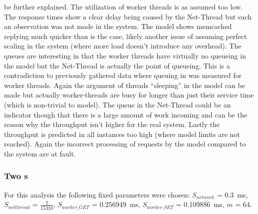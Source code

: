                 be further explained. The utilization of worker threads is as assumed too low. The response times show a
                clear delay being caused by the Net-Thread but such an observation was not made in the system. The
                model shows memcached replying much quicker than is the case, likely another issue of assuming perfect
                scaling in the system (where more load doesn't introduce any overhead). The queues are interesting in
                that the worker threads have virtually no queueing in the model but the Net-Thread is actually the point
                of queueing. This is a contradiction to previously gathered data where queuing in was measured for
                worker threads. Again the argument of threads ``sleeping'' in the model can be made but actually
                worker-threads are busy for longer than just their service time (which is non-trivial to model). The
                queue in the Net-Thread could be an indicator though that there is a large amount of work incoming and
                can be the reason why the throughput isn't higher for the real system. Lastly the throughput is
                predicted in all instances too high (where model limits are not reached). Again the incorrect processing
                of requests by the model compared to the system are at fault.

            \subsubsection{Two \mw{}s\label{subsubsec:7_noq_two-mws}}

                For this analysis the following fixed parameters were chosen: $S_{network}$ =
                \SI{0.3}{\milli\second}, $S_{netthread}$ = $\tfrac{2}{15310}$, $S_{worker\_GET}$ =
                \SI{0.256949}{\milli\second}, $S_{worker\_SET}$ = \SI{0.109886}{\milli\second}, $m$ = 64.

